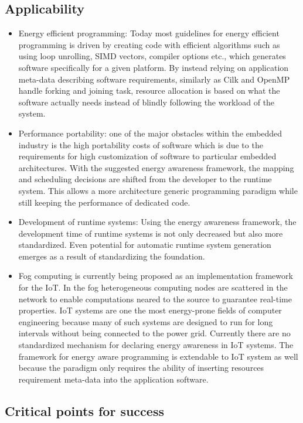 \documentclass{article}
\begin{document}
\subsection{Applicability}
\begin{itemize}
 \item Energy efficient programming: Today most guidelines for energy efficient programming is driven by creating code with efficient algorithms such as using loop unrolling, SIMD vectors, compiler options etc., which generates software specifically for a given platform. By instead relying on application meta-data describing software requirements, similarly as Cilk and OpenMP handle forking and joining task, resource allocation is based on what the software actually needs instead of blindly following the workload of the system.
 \item Performance portability: one of the major obstacles within the embedded industry is the high portability costs of software which is due to the requirements for high customization of software to particular embedded architectures. With the suggested energy awareness framework, the mapping and scheduling decisions are shifted from the developer to the runtime system. This allows a more architecture generic programming paradigm while still keeping the performance of dedicated code.
 \item Development of runtime systems: Using the energy awareness framework, the development time of runtime systems is not only decreased but also more standardized. Even potential for automatic runtime system generation emerges as a result of standardizing the foundation.
 \item Fog computing is currently being proposed as an implementation framework for the IoT. In the fog heterogeneous computing nodes are scattered in the network to enable computations neared to the source to guarantee real-time properties. IoT systems are one the most energy-prone fields of computer engineering because many of such systems are designed to run for long intervals without being connected to the power grid. Currently there are no standardized mechanism for declaring energy awareness in IoT systems. The framework for energy aware programming is extendable to IoT system as well because the paradigm only requires the ability of inserting resources requirement meta-data into the application software. 
\end{itemize}

\subsection{Critical points for success}
\end{document}
